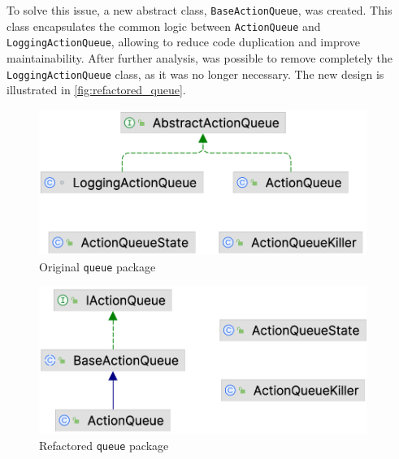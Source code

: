 To solve this issue, a new abstract class, \texttt{BaseActionQueue}, was created. This class encapsulates the common logic between \texttt{ActionQueue} and \texttt{LoggingActionQueue}, allowing to reduce code duplication and improve maintainability. After further analysis, was possible to remove completely the \texttt{LoggingActionQueue} class, as it was no longer necessary. The new design is illustrated in \autoref{fig:refactored_queue}.

\begin{minipage}{0.5\linewidth}
	\begin{figure}[H]
		\begin{center}
			\includegraphics[width=0.95\textwidth]{figures/queue_package/original.png}
			\caption{Original \texttt{queue} package}
			\label{fig:original_queue}
		\end{center}
	\end{figure}
\end{minipage}
\begin{minipage}{0.5\linewidth}
	\begin{figure}[H]
		\begin{center}
			\includegraphics[width=0.95\textwidth]{figures/queue_package/refactored.png}
			\caption{Refactored \texttt{queue} package}
			\label{fig:refactored_queue}
		\end{center}
	\end{figure}
\end{minipage}

